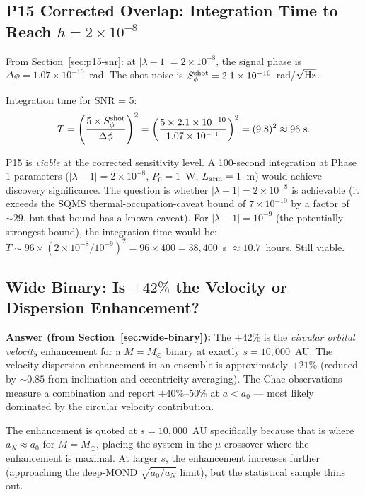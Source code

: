\documentclass[11pt]{article}
\theoremstyle{definition}
\theoremstyle{remark}
\newcommand{\ee}[1]{\times 10^{#1}}
\begin{document}
\subsection{P15 Corrected Overlap: Integration Time to Reach $h = 2\ee{-8}$}

From Section~\ref{sec:p15-snr}: at $|\lambda-1| = 2\ee{-8}$, the signal
phase is $\Delta\phi = 1.07\ee{-10}$~rad. The shot noise is
$S_\phi^{\rm shot} = 2.1\ee{-10}$~rad/$\sqrt{\rm Hz}$.

Integration time for SNR = 5:
\begin{equation}
T = \left(\frac{5 \times S_\phi^{\rm shot}}{\Delta\phi}\right)^2
= \left(\frac{5 \times 2.1\ee{-10}}{1.07\ee{-10}}\right)^2
= (9.8)^2 \approx 96~\text{s}.
\end{equation}

P15 is \emph{viable} at the corrected sensitivity level. A 100-second
integration at Phase 1 parameters ($|\lambda-1| = 2\ee{-8}$,
$P_0 = 1$~W, $L_{\rm arm} = 1$~m) would achieve discovery significance.
The question is whether $|\lambda-1| = 2\ee{-8}$ is achievable (it exceeds
the SQMS thermal-occupation-caveat bound of $7\ee{-10}$ by a factor of
$\sim 29$, but that bound has a known caveat). For $|\lambda-1| = 10^{-9}$
(the potentially strongest bound), the integration time would be:
$T \sim 96 \times (2\ee{-8}/10^{-9})^2 = 96 \times 400 = 38{,}400$~s
$\approx 10.7$~hours. Still viable.

\subsection{Wide Binary: Is $+42\%$ the Velocity or Dispersion Enhancement?}

\textbf{Answer (from Section~\ref{sec:wide-binary}):} The $+42\%$ is the
\emph{circular orbital velocity} enhancement for a $M = M_\odot$ binary at
exactly $s = 10{,}000$~AU. The velocity dispersion enhancement in an
ensemble is approximately $+21\%$ (reduced by $\sim 0.85$ from inclination
and eccentricity averaging). The Chae observations measure a combination
and report $+40\%$--$50\%$ at $a < a_0$ --- most likely dominated by the
circular velocity contribution.

The enhancement is quoted at $s = 10{,}000$~AU specifically because that is
where $a_N \approx a_0$ for $M = M_\odot$, placing the system in the
$\mu$-crossover where the enhancement is maximal. At larger $s$, the
enhancement increases further (approaching the deep-MOND $\sqrt{a_0/a_N}$
limit), but the statistical sample thins out.
\end{document}
